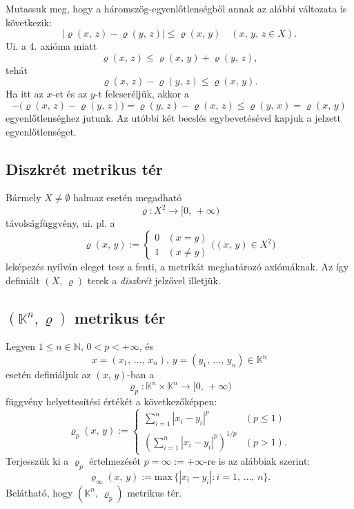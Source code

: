 \documentclass[12pt]{article}
\newcommand{\N}{\mathbb{N}}
\newcommand{\K}{\mathbb{K}}
\begin{document}
    Mutassuk meg, hogy a háromszög-egyenlőtlenségből annak az alábbi változata is következik:
    \[
        |\varrho(x, \, z) - \varrho(y, \, z)| \leq \varrho(x, \, y) \quad (x, \, y, \, z \in X).
    \]
    Ui. a 4. axióma miatt
    \[
        \varrho(x, \, z) \leq \varrho(x, \, y) + \varrho(y, \, z),
    \]
    tehát
    \[
        \varrho(x, \, z) - \varrho(y, \, z) \leq \varrho(x, \, y).
    \]
    Ha itt az $x$-et és az $y$-t felcseréljük, akkor a
    \[
        -\big( \varrho(x, \, z) - \varrho(y, \, z) \big) = \varrho(y, \, z) - \varrho(x, \, z) \leq \varrho(y, \, x) = \varrho(x, \, y)
    \]
    egyenlőtlenséghez jutunk. Az utóbbi két becslés egybevetésével kapjuk a jelzett egyenlőtlenséget. \newline

    \subsection{Diszkrét metrikus tér}
    Bármely $X \neq \emptyset$ halmaz esetén megadható
    \[
        \varrho : X^2 \to [0, \, + \infty)
    \]
    távolságfüggvény, ui. pl. a
    \[
        \varrho(x, \, y) :=
        \begin{cases}
            0 & (x = y) \\
            1 & (x \neq y)
        \end{cases}
        \big( (x, \, y) \in X^2 \big)
    \]
    leképezés nyilván eleget tesz a fenti, a metrikát meghatározó axiómáknak. Az így definiált $(X, \, \varrho)$ terek a \textit{diszkrét} jelzővel illetjük.

    \subsection{$(\K^n, \varrho)$ metrikus tér}
    Legyen $1 \leq n \in \N, \, 0 < p < + \infty$, és
    \[
        x = (x_1, \, \dots, \, x_n), \, y = (y_1, \, \dots, \, y_n) \in \K^n
    \]
    esetén definiáljuk az $(x, \, y)$-ban a
    \[
        \varrho_p : \K^n \times \K^n \to [0, \, + \infty)
    \]
    függvény helyettesítési értékét a következőképpen:
    \[
        \varrho_p(x, \, y) :=
        \begin{cases}
            \displaystyle \sum_{i = 1}^n |x_i - y_i|^p & (p \leq 1) \\
            \displaystyle \left(\sum_{i = 1}^n |x_i - y_i|^p \right)^{1/p} & (p > 1).
        \end{cases}
    \]
    Terjesszük ki a $\varrho_p$ értelmezését $p = \infty := + \infty$-re is az alábbiak szerint:
    \[
        \varrho_\infty(x, \, y) := \text{max} \, \big\{ |x_i - y_i| : i = 1, \, \dots, \, n \big\}.
    \]
    Belátható, hogy $(\K^n, \, \varrho_p)$ metrikus tér. 
    
\end{document}

